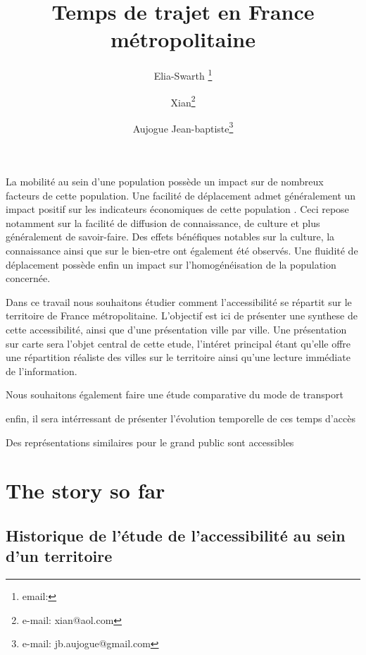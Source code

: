 \documentclass{vgtc}                          %
\title{Temps de trajet en France métropolitaine}
\author{Elia-Swarth \thanks{email:}\\ %
\and Xian\thanks{e-mail: xian@aol.com}\\ %
\and Aujogue Jean-baptiste\thanks{e-mail: jb.aujogue@gmail.com}} %
\begin{document}


\maketitle

La mobilité au sein d'une population possède un impact sur de nombreux facteurs de cette population. Une facilité de déplacement admet généralement un impact positif sur les indicateurs économiques de cette population \cite{}. Ceci repose notamment sur la facilité de diffusion de connaissance, de culture et plus généralement de savoir-faire. Des effets bénéfiques notables sur la culture, la connaissance ainsi que sur le bien-etre ont également été observés. Une fluidité de déplacement possède enfin un impact sur l'homogénéisation de la population concernée.

Dans ce travail nous souhaitons étudier comment l'accessibilité se répartit sur le territoire de France métropolitaine. L'objectif est ici de présenter une synthese de cette accessibilité, ainsi que d'une présentation ville par ville. Une présentation sur carte sera l'objet central de cette etude, l'intéret principal étant qu'elle offre une répartition réaliste des villes sur le territoire ainsi qu'une lecture immédiate de l'information. 

Nous souhaitons également faire une étude comparative du mode de transport

enfin, il sera intérressant de présenter l'évolution temporelle de ces temps d'accès


Des représentations similaires pour le grand public sont accessibles \cite{LeMonde1}

\vspace{0.3cm}
\section{The story so far}

\vspace{0.3cm}

\subsection{Historique de l'étude de l'accessibilité au sein d'un territoire}
\end{document}
